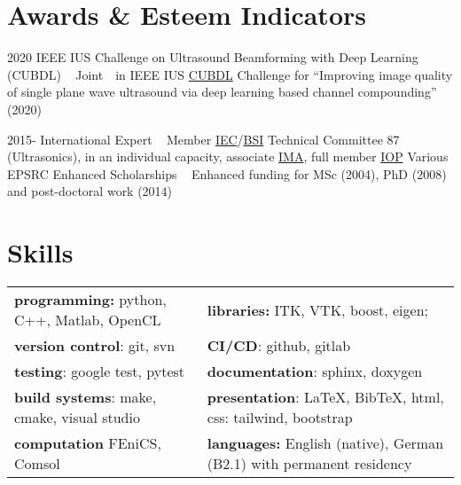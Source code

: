 \documentclass[english, print]{cv-style-wide}
\begin{document}
\section{Awards \& Esteem Indicators}
\vspace{-0.2cm}
\begin{entrylist}
\entry
{2020}
{IEEE IUS Challenge on Ultrasound Beamforming with Deep Learning (CUBDL)}
{~}
{Joint~~in IEEE IUS \href{https://cubdl.jhu.edu/}{CUBDL} Challenge for \enquote{Improving image quality of single plane wave ultrasound via deep learning based channel compounding} (2020) }

\entry
{2015-}
{International Expert}
{~}
{Member \href{https://iec.ch/dyn/www/f?p=103:7:::::FSP_ORG_ID:1281}{IEC}/\href{https://standardsdevelopment.bsigroup.com/committees/50001534}{BSI} Technical Committee 87 (Ultrasonics), in an individual capacity, associate \href{https://ima.org.uk/}{IMA}, full member \href{https://www.iop.org/}{IOP}}
%
%
%
\entry
{Various}
{EPSRC Enhanced Scholarships}
{~}
{Enhanced funding for MSc (2004), PhD (2008) and post-doctoral work (2014)}
\end{entrylist}



\section{Skills}
  \vspace{-0.2cm}
\begin{tabular}{p{} p{} }
\textbf{programming:} python, C++, Matlab, OpenCL &
\textbf{libraries:} ITK, VTK, boost, eigen; \\
\textbf{version control}: git, svn & \textbf{CI/CD}: github, gitlab \\
\textbf{testing}: google test, pytest & \textbf{documentation}: sphinx, doxygen \\
\textbf{build systems}: make, cmake, visual studio  & \textbf{presentation}: \LaTeX{}, Bib\TeX{}, html, css: tailwind, bootstrap \\
\textbf{computation} FEniCS, Comsol & \textbf{languages:} English (native), German (B2.1) with permanent residency 
\end{tabular}
\end{document}
